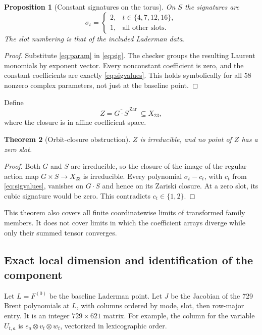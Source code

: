 \documentclass[11pt,letterpaper]{article}
\newtheorem{theorem}{Theorem}[section]
\newtheorem{proposition}[theorem]{Proposition}
\theoremstyle{definition}\newtheorem{definition}[theorem]{Definition}
\theoremstyle{remark}\newtheorem{remark}[theorem]{Remark}
\begin{document}
\begin{proposition}[Constant signatures on the torus]\label{prop:sig}
On $S$ the signatures are
\begin{equation}\label{eq:sigvalues}
\sigma_t=\begin{cases}
2,&t\in\{4,7,12,16\},\\
1,&\text{all other slots}.
\end{cases}
\end{equation}
The slot numbering is that of the included Laderman data.
\end{proposition}
\begin{proof}
Substitute \eqref{eq:param} in \eqref{eq:sig}. The checker groups the
resulting Laurent monomials by exponent vector. Every nonconstant
coefficient is zero, and the constant coefficients are exactly
\eqref{eq:sigvalues}. This holds symbolically for all 58 nonzero complex
parameters, not just at the baseline point.
\end{proof}

Define
\begin{equation}\label{eq:Z}
 Z=\overline{G\cdot S}^{\,\mathrm{Zar}}\ \subseteq X_{23},
\end{equation}
where the closure is in affine coefficient space.

\begin{theorem}[Orbit-closure obstruction]\label{thm:closure}
$Z$ is irreducible, and no point of $Z$ has a zero slot.
\end{theorem}
\begin{proof}
Both $G$ and $S$ are irreducible, so the closure of the image of the
regular action map $G\times S\to X_{23}$ is irreducible. Every polynomial
$\sigma_t-c_t$, with $c_t$ from \eqref{eq:sigvalues}, vanishes on $G\cdot S$
and hence on its Zariski closure. At a zero slot, its cubic signature
would be zero. This contradicts $c_t\in\{1,2\}$.
\end{proof}

This theorem also covers all finite coordinatewise limits of transformed
family members. It does not cover limits in which the coefficient arrays
diverge while only their summed tensor converges.

\subsection{Exact local dimension and identification of the component}
Let $L=F^{(0)}$ be the baseline Laderman point. Let $J$ be the Jacobian of
the 729 Brent polynomials at $L$, with columns ordered by mode, slot,
then row-major entry. It is an integer $729\times621$ matrix.
For example, the column for the variable $U_{t,a}$ is
$e_a\otimes v_t\otimes w_t$, vectorized in lexicographic order.
\end{document}
